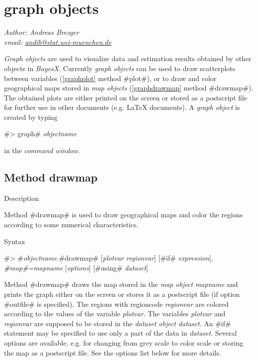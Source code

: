 \chapter{graph objects}
\label{graphobj}  

{\em Author: Andreas Brezger} \\
{\em email: \href{mailto:andib@stat.uni-muenchen.de}{andib@stat.uni-muenchen.de}}\\
\vspace{0.3cm}


{\em Graph objects} are used to visualize data and estimation
results obtained by other objects in {\em BayesX}. Currently {\em
graph objects} can be used to draw scatterplots between variables
(\autoref{graphplot} method #plot#), or to draw and color
geographical maps stored in {\em map objects}
(\autoref{graphdrawmap} method #drawmap#). The obtained plots are
either printed on the screen or stored as a postscript file for
further use in other documents (e.g. \LaTeX\/ documents).
A {\em graph object} is created by typing

#> graph# {\em objectname}

in the {\em command window}.



\clearpage



\section{Method drawmap}
\label{graphdrawmap} 

\begin{stanza}{Description}

{Method #drawmap# is used to draw geographical maps and color the
regions according to some numerical characteristics.}
\end{stanza}

\begin{stanza}{Syntax}

 #> #{\em objectname}.#drawmap#  [{\em plotvar regionvar}] [#if# {\em expression}], {\em #map#=mapname} [{\em options}]
 [#using# {\em dataset}]

Method #drawmap# draws the map stored in the {\em map object} {\em
mapname} and prints the graph either on the screen or stores it as
a postscript file (if option #outfile# is specified). The regions
with regioncode {\em regionvar} are colored according to the
values of the variable {\em plotvar}. The variables {\em plotvar}
and {\em regionvar} are supposed to be stored in the {\em dataset
object} {\em dataset}. An #if# statement may be specified to use
only a part of the data in {\em dataset}. Several options are
available, e.g. for changing from grey scale to color scale or
storing the map as a postscript file. See the options list below
for more details.
\end{stanza}

